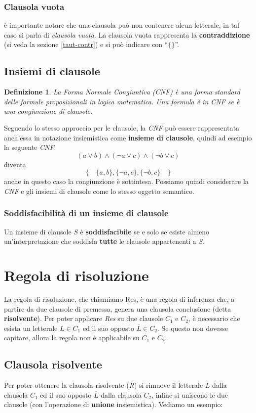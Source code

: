 \documentclass[a4paper,12pt]{report}
\newtheorem{definition}{Definizione}[section]
\begin{document}
\subsubsection{Clausola vuota}
è importante notare che una clausola può non contenere alcun letterale, in tal caso si parla di \emph{clausola vuota}. La clausola vuota rappresenta la \textbf{contraddizione} (si veda la sezione \ref{taut-contr}) e si può indicare con ``$\{ \}$''.

\subsection{Insiemi di clausole}
\begin{definition}
    La Forma Normale Congiuntiva (CNF) è una forma standard delle formule proposizionali in logica matematica. Una formula è in CNF se è una congiunzione di clausole.
\end{definition}
\noindent Seguendo lo stesso approccio per le clausole, la \emph{CNF} può essere rappresentata anch'essa in notazione insiemistica come \textbf{insieme di clausole}, quindi ad esempio la seguente \emph{CNF}:
\[ (a \lor b) \land (\lnot a \lor c) \land (\lnot b \lor c) \]
diventa
\[\{ \quad \{a, b\}, \{\lnot a, c\}, \{\lnot b, c\} \quad \}\]
anche in questo caso la congiunzione è sottintesa. Possiamo quindi considerare la \emph{CNF} e gli insiemi di clausole come lo stesso oggetto semantico.

\subsubsection{Soddisfacibilità di un insieme di clausole}
Un insieme di clausole $S$ è \textbf{soddisfacibile} se e solo se esiste almeno un'interpretazione che soddisfa \textbf{tutte} le clausole appartenenti a $S$.

\section{Regola di risoluzione}
\label{Res}
La regola di risoluzione, che chiamiamo Res, è una regola di inferenza che, a partire da due clausole di premessa, genera una clausola conclusione (detta \textbf{risolvente}). Per poter applicare \emph{Res} su due clausole $C_1$ e $C_2$, è necessario che esista un letterale $L \in C_1$ ed il suo opposto $\overline{L} \in C_2$. Se questo non dovesse capitare, allora la regola non è applicabile su $C_1$ e $C_2$.

\subsection{Clausola risolvente}
Per poter ottenere la clausola risolvente (\emph{R}) si rimuove il letterale $L$ dalla clausola $C_1$ ed il suo opposto $\overline{L}$ dalla clausola $C_2$, infine si uniscono le due clausole (con l'operazione di \textbf{unione} insiemistica). Vediamo un esempio:
\end{document}
